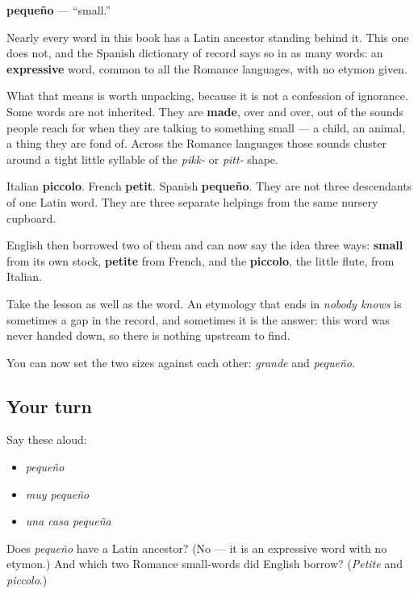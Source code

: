 \begin{cousinweb}
\textbf{pequeño} — \textquotedblleft{}small.\textquotedblright{}

Nearly every word in this book has a Latin ancestor standing behind it. This one does not, and the Spanish dictionary of record says so in as many words: an \textbf{expressive} word, common to all the Romance languages, with no etymon given.

What that means is worth unpacking, because it is not a confession of ignorance. Some words are not inherited. They are \textbf{made}, over and over, out of the sounds people reach for when they are talking to something small — a child, an animal, a thing they are fond of. Across the Romance languages those sounds cluster around a tight little syllable of the \emph{pikk-} or \emph{pitt-} shape.

Italian \textbf{piccolo}. French \textbf{petit}. Spanish \textbf{pequeño}. They are not three descendants of one Latin word. They are three separate helpings from the same nursery cupboard.

English then borrowed two of them and can now say the idea three ways: \textbf{small} from its own stock, \textbf{petite} from French, and the \textbf{piccolo}, the little flute, from Italian.

Take the lesson as well as the word. An etymology that ends in \emph{nobody knows} is sometimes a gap in the record, and sometimes it is the answer: this word was never handed down, so there is nothing upstream to find.
\end{cousinweb}

\begin{grammarlens}[title={What you've built}]
You can now set the two sizes against each other: \emph{grande} and \emph{pequeño}.
\end{grammarlens}

\subsection*{Your turn}
Say these aloud:

\begin{itemize}
\raggedright
  \item \emph{pequeño}
  \item \emph{muy pequeño}
  \item \emph{una casa pequeña}
\end{itemize}

\begin{tcolorbox}[breakable,colback=teal!4,colframe=teal!35!black,title={Before you move on}]
Does \emph{pequeño} have a Latin ancestor? (No — it is an expressive word with no etymon.) And which two Romance small-words did English borrow? (\emph{Petite} and \emph{piccolo}.)
\end{tcolorbox}
